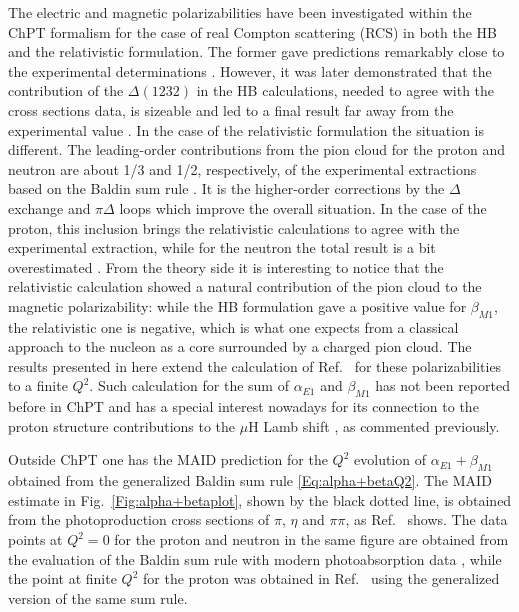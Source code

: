 \documentclass[twocolumn,prc,showpacs,nofootinbib,preprintnumbers,amsmath,amssymb,superscriptaddress]{revtex4-1}
\begin{document}
The electric and magnetic polarizabilities have been investigated within the ChPT formalism for the case of real Compton scattering (RCS) in both the HB and the relativistic formulation. 
The former gave predictions remarkably close to the experimental determinations \cite{Bernard:1991rq,Bernard:1991ru}.
However, it was later demonstrated that the contribution of the $\Delta(1232)$ in the HB calculations, needed to agree with the cross sections data, is sizeable and led to a final result far away from the experimental value \cite{Hemmert:1996rw}.
In the case of the relativistic formulation the situation is different. 
The leading-order contributions from the pion cloud for the proton and neutron are about 1/3 and 1/2, respectively, of the experimental extractions based on the Baldin sum rule \cite{Babusci:1997ij}.
It is the higher-order corrections by the $\Delta$ exchange and $\pi\Delta$ loops which improve the overall situation. 
In the case of the proton, this inclusion brings the relativistic calculations to agree with the experimental extraction, while for the neutron the total result is a bit overestimated \cite{Babusci:1997ij}.
From the theory side it is interesting to notice that the relativistic calculation showed a natural contribution of the pion cloud to the magnetic polarizability: while the HB formulation gave a positive value for $\beta_{M1}$, the relativistic one is negative, which is what one expects from a classical approach to the nucleon as a core surrounded by a charged pion cloud.
The results presented in here extend the calculation of Ref.~\cite{Lensky:2009uv} for these polarizabilities to a finite $Q^2$. 
Such calculation for the sum of $\alpha_{E1}$ and $\beta_{M1}$ has not been reported before in ChPT and has a special interest nowadays for its connection to the proton structure contributions to the $\mu$H Lamb shift \cite{Alarcon:2013cba}, as commented previously. 


Outside ChPT one has the MAID prediction \cite{Drechsel:2000ct,Drechsel:1998hk} for the $Q^2$ evolution of $\alpha_{E1}+\beta_{M1}$ obtained from the generalized Baldin sum rule \eqref{Eq:alpha+betaQ2}. 
The MAID estimate \cite{MAID} in Fig.~\ref{Fig:alpha+betaplot}, shown by the black dotted line, is obtained from the photoproduction cross sections of $\pi$, $\eta$ and $\pi \pi$, as Ref.~\cite{Drechsel:2002ar} shows. 
The data points at $Q^2=0$ for the proton and neutron in the same figure are obtained from the evaluation of the Baldin sum rule with modern photoabsorption data \cite{Babusci:1997ij,OlmosdeLeon:2001zn,Gryniuk:2015}, while the point at finite $Q^2$ for the proton was obtained in Ref.~\cite{Liang:2004tk} using the generalized version of the same sum rule.
\end{document}
